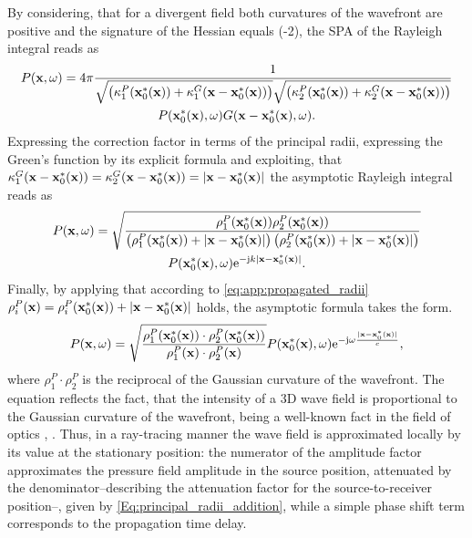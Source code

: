 By considering, that for a divergent field both curvatures of the wavefront are positive and the signature of the Hessian equals (-2), the SPA of the Rayleigh integral reads as
\begin{multline}
P(\mathbf{x},\omega) = 4\pi \frac{1}
{
\sqrt{\left(\kappa_1^P(\mathbf{x}_0^*(\mathbf{x})) + \kappa_1^G(\mathbf{x}-\mathbf{x}_0^*(\mathbf{x}))\right)}
\sqrt{\left(\kappa_2^P(\mathbf{x}_0^*(\mathbf{x})) + \kappa_2^G(\mathbf{x}-\mathbf{x}_0^*(\mathbf{x}))\right)}
} \\
P(\mathbf{x}_0^*(\mathbf{x}),\omega) G(\mathbf{x}-\mathbf{x}_0^*(\mathbf{x}),\omega).
\end{multline}
Expressing the correction factor in terms of the principal radii, expressing the Green's function by its explicit formula and exploiting, that $\kappa_1^G(\mathbf{x}-\mathbf{x}_0^*(\mathbf{x})) = \kappa_2^G(\mathbf{x}-\mathbf{x}_0^*(\mathbf{x})) = |\mathbf{x}-\mathbf{x}_0^*(\mathbf{x})|$ the asymptotic Rayleigh integral reads as
\begin{multline}
P(\mathbf{x},\omega) =
\sqrt{ \frac{ \rho_1^P(\mathbf{x}_0^*(\mathbf{x})) \rho_2^P(\mathbf{x}_0^*(\mathbf{x})) }{ \left(\rho_1^P(\mathbf{x}_0^*(\mathbf{x})) + |\mathbf{x}-\mathbf{x}_0^*(\mathbf{x})| \right) \left(\rho_2^P(\mathbf{x}_0^*(\mathbf{x})) + |\mathbf{x}-\mathbf{x}_0^*(\mathbf{x})|\right) } }
\\
P(\mathbf{x}_0^*(\mathbf{x}),\omega) \mathrm{e}^{-\mathrm{j} k |\mathbf{x}-\mathbf{x}_0^*(\mathbf{x})| }.
\end{multline}
Finally, by applying that according to \eqref{eq:app:propagated_radii} $\rho_i^P(\mathbf{x}) = \rho_i^P(\mathbf{x}_0^*(\mathbf{x})) + |\mathbf{x}-\mathbf{x}_0^*(\mathbf{x})|$ holds, the asymptotic formula takes the form.
\begin{equation}
P(\mathbf{x},\omega) =
\sqrt{ \frac{ \rho_1^P(\mathbf{x}_0^*(\mathbf{x})) \cdot \rho_2^P(\mathbf{x}_0^*(\mathbf{x})) }{ \rho^P_1(\mathbf{x}) \cdot \rho^P_2(\mathbf{x}) } }
P(\mathbf{x}_0^*(\mathbf{x}),\omega) \mathrm{e}^{-\mathrm{j} \omega \frac{|\mathbf{x}-\mathbf{x}_0^*(\mathbf{x})| }{c} },
\end{equation}
where $\rho^P_1 \cdot \rho^P_2$ is the reciprocal of the Gaussian curvature of the wavefront.
The equation reflects the fact, that the intensity of a 3D wave field is proportional to the Gaussian curvature of the wavefront, being a well-known fact in the field of optics \cite[Sec. 3.1]{Born1970}, \cite[Sec. 1.3]{Bouche1997}.
Thus, in a ray-tracing manner the wave field is approximated locally by its value at the stationary position: 
the numerator of the amplitude factor approximates the pressure field amplitude in the source position, attenuated by the denominator--describing the attenuation factor for the source-to-receiver position--, given by \eqref{Eq:principal_radii_addition}, while a simple phase shift term corresponds to the propagation time delay.

